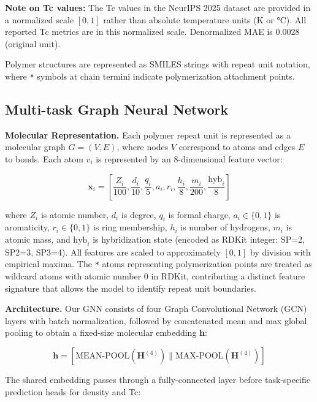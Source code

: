 \documentclass{article}
\begin{document}
\noindent\textbf{Note on Tc values:} The Tc values in the NeurIPS 2025 dataset
are provided in a normalized scale $[0, 1]$ rather than absolute temperature
units (K or °C). All reported Tc metrics are in this normalized scale.
Denormalized MAE is 0.0028 (original unit).

Polymer structures are represented as SMILES strings with repeat unit notation,
where \texttt{*} symbols at chain termini indicate polymerization attachment points.

\subsection{Multi-task Graph Neural Network}

\noindent\textbf{Molecular Representation.}
Each polymer repeat unit is represented as a molecular graph $G = (V, E)$,
where nodes $V$ correspond to atoms and edges $E$ to bonds.
Each atom $v_i$ is represented by an 8-dimensional feature vector:

\begin{equation}
\mathbf{x}_i = [\frac{Z_i}{100}, \frac{d_i}{10}, \frac{q_i}{5},
a_i, r_i, \frac{h_i}{8}, \frac{m_i}{200}, \frac{\text{hyb}_i}{8}]
\end{equation}

where $Z_i$ is atomic number, $d_i$ is degree, $q_i$ is formal charge,
$a_i \in \{0,1\}$ is aromaticity, $r_i \in \{0,1\}$ is ring membership,
$h_i$ is number of hydrogens, $m_i$ is atomic mass, and
$\text{hyb}_i$ is hybridization state (encoded as RDKit integer: SP=2, SP2=3, SP3=4).
All features are scaled to approximately $[0, 1]$ by division with empirical maxima.
The \texttt{*} atoms representing polymerization points are treated as
wildcard atoms with atomic number 0 in RDKit, contributing a distinct
feature signature that allows the model to identify repeat unit boundaries.

\noindent\textbf{Architecture.}
Our GNN consists of four Graph Convolutional Network (GCN) layers
\citep{kipf_gcn_2017} with batch normalization, followed by concatenated
mean and max global pooling to obtain a fixed-size molecular embedding $\mathbf{h}$:

\begin{equation}
\mathbf{h} = [\text{MEAN-POOL}(\mathbf{H}^{(4)}) \| \text{MAX-POOL}(\mathbf{H}^{(4)})]
\end{equation}

The shared embedding passes through a fully-connected layer before
task-specific prediction heads for density and Tc:
\end{document}
